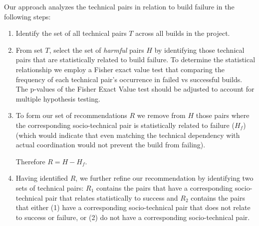 \documentclass[conference]{IEEEtran}
\begin{document}


Our approach analyzes the technical pairs in relation to build failure in the following steps:

\begin{enumerate}
\item Identify the set of all technical pairs $T$ across all builds in the project.

\item From set $T$, select the set of \emph{harmful} pairs $H$ by identifying those technical pairs that are statistically related to build failure. To determine the statistical relationship we employ a Fisher exact value test that comparing the frequency of each technical pair's occurrence in failed vs successful builds. The p-values of the Fisher Exact Value test should be adjusted to account for multiple hypothesis testing.


\item To form our set of recommendations $R$  we remove from $H$ those pairs where the corresponding socio-technical pair is statistically related to failure ($H_f$) (which would indicate that even matching the technical dependency with actual coordination would not prevent the build from failing). 

Therefore $R = H - H_f$.



\item Having identified $R$, we further refine our recommendation by identifying two sets of technical pairs: $R_1$ contains the pairs that have a corresponding socio-technical pair that relates statistically to success and $R_2$ contains the pairs that either (1) have a corresponding socio-technical pair that does not relate to success or failure, or (2) do not have a corresponding socio-technical pair.


\end{enumerate}
\end{document}
